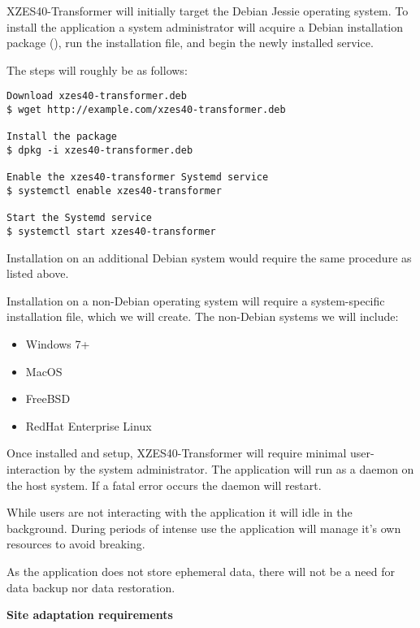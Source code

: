 XZES40-Transformer will initially target the Debian Jessie operating system.
To install the application a system administrator will acquire a Debian installation package (), run the installation file, and begin the newly installed service.

The steps will roughly be as follows:
\begin{lstlisting}
Download xzes40-transformer.deb
$ wget http://example.com/xzes40-transformer.deb

Install the package
$ dpkg -i xzes40-transformer.deb

Enable the xzes40-transformer Systemd service
$ systemctl enable xzes40-transformer

Start the Systemd service
$ systemctl start xzes40-transformer
\end{lstlisting}

Installation on an additional Debian system would require the same procedure as listed above.

Installation on a non-Debian operating system will require a system-specific installation file, which we will create.
The non-Debian systems we will include:
\begin{itemize}
  \item Windows 7+
  \item MacOS
  \item FreeBSD
  \item RedHat Enterprise Linux
\end{itemize}

Once installed and setup, XZES40-Transformer will require minimal user-interaction by the system administrator.
The application will run as a daemon on the host system.
If a fatal error occurs the daemon will restart.

While users are not interacting with the application it will idle in the background.
During periods of intense use the application will manage it's own resources to avoid breaking.

As the application does not store ephemeral data, there will not be a need for data backup nor data restoration.

\textbf{Site adaptation requirements}

